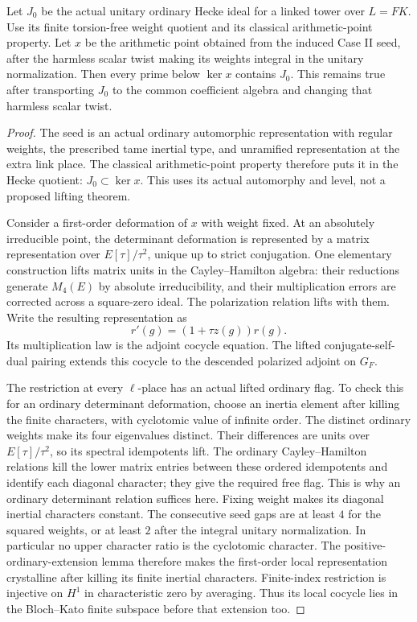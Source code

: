 \begin{srproposition}
\label{prop:sr-seed-local-zero}
Let \(J_0\) be the actual unitary ordinary Hecke ideal for a
linked tower over \(L=FK\).
Use its finite torsion-free weight quotient and its classical
arithmetic-point property.
Let \(x\) be the arithmetic point obtained from the induced
Case II seed, after the harmless scalar twist making its
weights integral in the unitary normalization.
Then every prime below \(\ker x\) contains \(J_0\).
This remains true after transporting \(J_0\) to the common
coefficient algebra and changing that harmless scalar twist.
\end{srproposition}
\begin{proof}
The seed is an actual ordinary automorphic representation
with regular weights, the prescribed tame inertial type,
and unramified representation at the extra link place.
The classical arithmetic-point property therefore puts it
in the Hecke quotient: \(J_0\subset\ker x\).
This uses its actual automorphy and level, not a proposed
lifting theorem.

Consider a first-order deformation of \(x\) with weight fixed.
At an absolutely irreducible point, the determinant
deformation is represented by a matrix representation over
\(E[\tau]/\tau^2\), unique up to strict conjugation.
One elementary construction lifts matrix units in the
Cayley--Hamilton algebra: their reductions generate \(M_4(E)\)
by absolute irreducibility, and their multiplication errors
are corrected across a square-zero ideal.
The polarization relation lifts with them.
Write the resulting representation as
\[
 r'(g)=(1+\tau z(g))r(g).
\]
Its multiplication law is the adjoint cocycle equation.
The lifted conjugate-self-dual pairing extends this cocycle
to the descended polarized adjoint on \(G_F\).

The restriction at every \(\ell\)-place has an actual lifted
ordinary flag. To check this for an ordinary determinant
deformation, choose an inertia element after killing the
finite characters, with cyclotomic value of infinite order.
The distinct ordinary weights make its four eigenvalues
distinct. Their differences are units over
\(E[\tau]/\tau^2\), so its spectral idempotents lift.
The ordinary Cayley--Hamilton relations kill the lower
matrix entries between these ordered idempotents and
identify each diagonal character; they give the required
free flag. This is why an ordinary determinant relation
suffices here.
Fixing weight makes its diagonal inertial characters constant.
The consecutive seed gaps are at least \(4\) for the squared
weights, or at least \(2\) after the integral unitary
normalization. In particular no upper character ratio is
the cyclotomic character.
The positive-ordinary-extension lemma therefore makes the
first-order local representation crystalline after killing
its finite inertial characters.
Finite-index restriction is injective on \(H^1\) in
characteristic zero by averaging.
Thus its local cocycle lies in the Bloch--Kato finite
subspace before that extension too.


\end{proof}
